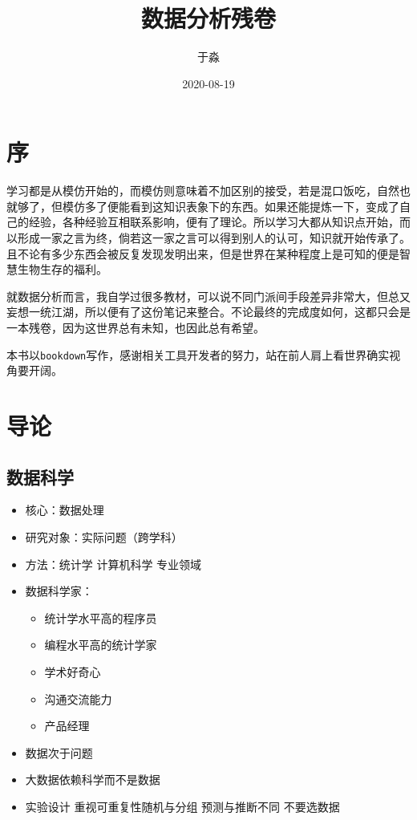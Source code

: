 \documentclass[
]{book}
\title{数据分析残卷}
\author{于淼}
\date{2020-08-19}
\providecommand{\tightlist}{%
  \setlength{\itemsep}{0pt}\setlength{\parskip}{0pt}}
\begin{document}
\maketitle

{
\setcounter{tocdepth}{1}
\tableofcontents
}
\hypertarget{ux5e8f}{%
\chapter*{序}\label{ux5e8f}}

学习都是从模仿开始的，而模仿则意味着不加区别的接受，若是混口饭吃，自然也就够了，但模仿多了便能看到这知识表象下的东西。如果还能提炼一下，变成了自己的经验，各种经验互相联系影响，便有了理论。所以学习大都从知识点开始，而以形成一家之言为终，倘若这一家之言可以得到别人的认可，知识就开始传承了。且不论有多少东西会被反复发现发明出来，但是世界在某种程度上是可知的便是智慧生物生存的福利。

就数据分析而言，我自学过很多教材，可以说不同门派间手段差异非常大，但总又妄想一统江湖，所以便有了这份笔记来整合。不论最终的完成度如何，这都只会是一本残卷，因为这世界总有未知，也因此总有希望。

本书以\texttt{bookdown}写作，感谢相关工具开发者的努力，站在前人肩上看世界确实视角要开阔。

\hypertarget{intro}{%
\chapter{导论}\label{intro}}

\hypertarget{ux6570ux636eux79d1ux5b66}{%
\section{数据科学}\label{ux6570ux636eux79d1ux5b66}}

\begin{itemize}
\tightlist
\item
  核心：数据处理
\item
  研究对象：实际问题（跨学科）
\item
  方法：统计学 计算机科学 专业领域
\item
  数据科学家：

  \begin{itemize}
  \tightlist
  \item
    统计学水平高的程序员
  \item
    编程水平高的统计学家
  \item
    学术好奇心
  \item
    沟通交流能力
  \item
    产品经理
  \end{itemize}
\item
  数据次于问题
\item
  大数据依赖科学而不是数据
\item
  实验设计 重视可重复性随机与分组 预测与推断不同 不要选数据
\end{itemize}
\end{document}
